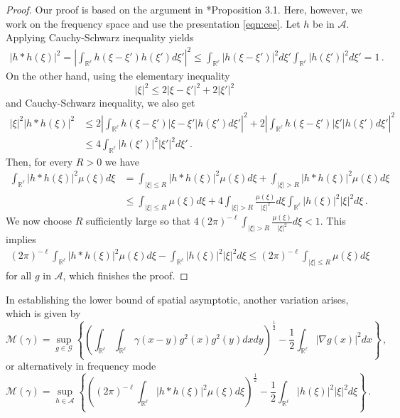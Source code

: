 \documentclass[12pt,reqno]{amsart}
\theoremstyle{remark}
\newcommand{\1}{\mathbf{1}}
\def\RR{\mathbb{R}}
\def\cmm{{\mathcal M}}
\def\caa{{\mathcal A}}
\def\cgg{{\mathcal G}}
\def\lt{\left}
\def\rt{\right}
\begin{document}
		\begin{proof}
			Our proof is based on the argument in \cite{Chetal16}*{Proposition 3.1}. Here, however, we work on the frequency space and use the presentation \eqref{eqn:cee}. Let $h$ be in $\caa$. Applying Cauchy-Schwarz inequality yields
			\begin{align*}
				|h*h(\xi)|^2=\lt|\int_{\RR^\ell}h(\xi- \xi')h(\xi')d \xi'\rt|^2
				\le \int_{\RR^\ell}|h(\xi- \xi')|^2d \xi'\int_{\RR^\ell}|h(\xi')|^2d \xi'=1\,.
			\end{align*}
			On the other hand, using the elementary inequality
			\begin{equation*}
				|\xi|^2\le 2|\xi- \xi'|^2+2|\xi'|^2
			\end{equation*}
			and Cauchy-Schwarz inequality, we also get
			\begin{align*}
				|\xi|^2 |h*h(\xi)|^2
				&\le {2}\lt|\int_{\RR^\ell}h(\xi -\xi')|\xi- \xi'|h(\xi')d \xi' \rt|^2+{2}\lt|\int_{\RR^\ell}h(\xi -\xi')|\xi'|h(\xi')d \xi' \rt|^2
				\\&\le{ 4}\int_{\RR^\ell}|h(\xi')|^2|\xi'|^2 d \xi'\,.
			\end{align*}
			Then, for every $R>0$ we have
			\begin{align*}
				\int_{\RR^\ell}|h*h(\xi)|^2 \mu(\xi)d \xi
				&=\int_{|\xi|\le R}|h*h(\xi)|^2 \mu(\xi)d \xi+\int_{|\xi|>R}|h*h(\xi)|^2 \mu(\xi)d \xi
				\\&\le \int_{|\xi|\le R} \mu(\xi)d \xi+{4}\int_{|\xi|>R}\frac{ \mu(\xi)}{|\xi|^2} d \xi\int_{\RR^\ell}|h(\xi)|^2|\xi|^2 d \xi\,.
			\end{align*}
			We now choose $R$ sufficiently large so that ${ 4}(2 \pi)^{-\ell} \int_{|\xi|>R}\frac{ \mu(\xi)}{|\xi|^2} d \xi<1$. This implies
			\begin{align*}
				(2 \pi)^{-\ell}\int_{\RR^\ell}|h*h(\xi)|^2 \mu(\xi)d \xi-\int_{\RR^\ell}|h(\xi)|^2|\xi|^2 d \xi \le (2 \pi)^{-\ell}\int_{|\xi|\le R} \mu(\xi)d \xi
			\end{align*}
			for all $g$ in $\caa$, which finishes the proof.
		\end{proof}
		In establishing the lower bound of spatial asymptotic, another variation arises, which is given by
		\begin{equation}\label{eqn:rootcee}
			\cmm(\gamma)=\sup_{g\in\cgg}\lt\{\lt(\int_{\RR^\ell}\int_{\RR^\ell}\gamma(x-y)g^2(x)g^2(y)dxdy\rt)^{\frac12}-\frac12\int_{\RR^\ell}|\nabla g(x) |^2dx \rt\}\,,
		\end{equation}
		or alternatively in frequency mode
		\begin{equation}\label{eqn:rootceefourier}
			\cmm(\gamma)=\sup_{h\in\caa}\lt\{\lt((2 \pi)^{-\ell} \int_{\RR^\ell} |h*h(\xi)|^2 \mu( \xi)d \xi\rt)^{\frac12}-\frac12\int_{\RR^\ell}|h(\xi)|^2|\xi|^2 d \xi \rt\}\,.
		\end{equation}
\end{document}
